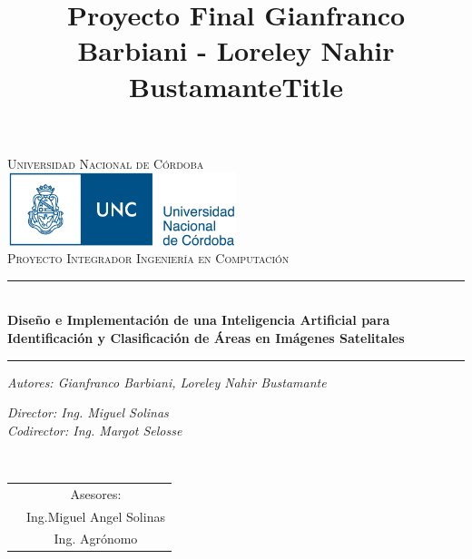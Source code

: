 \documentclass[a4paper,openright,12pt]{report}
\title{Proyecto Final Gianfranco Barbiani - Loreley Nahir Bustamante}
\begin{document}

\begin{titlepage}
\begin{center}

\textsc{Universidad Nacional de Córdoba}\\[1.5cm] %

\includegraphics[width=0.5\textwidth]{logo_unc.pdf}~\\[1cm]

\textsc{\Large Proyecto Integrador Ingeniería en Computación }\\[0.5cm] %

\rule{1.5\textwidth}{.4pt} %
\title{Title }\\[0.4cm] %
\textbf{\Huge{Diseño e Implementación de una Inteligencia Artificial para Identificación y Clasificación de Áreas en Imágenes Satelitales}}
\rule{1.5\textwidth}{.4pt} %
 
\begin{minipage}{0.4\textwidth}
\begin{flushleft} \large
\emph{Autores: Gianfranco Barbiani, Loreley Nahir Bustamante}\\


\end{flushleft}
\end{minipage}
\begin{minipage}{0.4\textwidth}
\begin{flushright} \large
\emph{Director: Ing. Miguel Solinas} \\
\emph{Codirector: Ing. Margot Selosse} \\
 
\end{flushright}
\end{minipage}\\[1cm]

\begin{table}[H]
\centering
\label{my-label}
\begin{tabular}{cc}
           & Asesores:             \\
& Ing.Miguel Angel Solinas      \\
          & Ing. Agrónomo
\end{tabular}
\end{table}


\end{center}
\end{titlepage}
\end{document}
